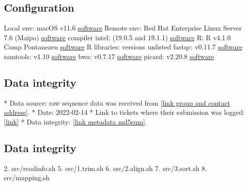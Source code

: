 \markdownRendererUlEndTight \markdownRendererInterblockSeparator
{}\subsection{Configuration}\markdownRendererInterblockSeparator
{}\markdownRendererUlBeginTight
\markdownRendererUlItem Local env: macOS v11.6 \href{https://support.apple.com/macos}{software}\markdownRendererUlItemEnd 
\markdownRendererUlItem Remote env: Red Hat Enterprise Linux Server 7.6 (Maipo) \href{https://www.redhat.com/en/technologies/linux-platforms/enterprise-linux}{software}\markdownRendererUlItemEnd 
\markdownRendererUlItem compiler intel: (19.0.5 and 19.1.1) \href{https://www.intel.com/content/www/us/en/developer/tools/oneapi/commercial-base-hpc.html#gs.ppyt3x}{software}\markdownRendererUlItemEnd 
\markdownRendererUlItem R: R v4.1.0 Camp Pontanezen \href{https://www.r-project.org}{software}\markdownRendererUlItemEnd 
\markdownRendererUlItem R libraries: versions unlisted\markdownRendererUlItemEnd 
\markdownRendererUlItem fastqc: v0.11.7 \href{https://www.bioinformatics.babraham.ac.uk/projects/fastqc/}{software}\markdownRendererUlItemEnd 
\markdownRendererUlItem samtools: v1.10 \href{https://www.htslib.org}{software}\markdownRendererUlItemEnd 
\markdownRendererUlItem bwa: v0.7.17 \href{https://janis.readthedocs.io/en/latest/tools/bioinformatics/bwa/bwamem.html}{software}\markdownRendererUlItemEnd 
\markdownRendererUlItem picard: v2.20.8 \href{http://broadinstitute.github.io/picard/}{software}\markdownRendererUlItemEnd 
\markdownRendererUlEndTight \markdownRendererInterblockSeparator
{}\subsection{Data integrity} * Data source: raw sequence data was received from [\href{https://www.sophiagenetics.com}{link group and contact address}]. * Date: 2022-02-14 * Link to tickets where their submission was logged: [\href{https://www.sophiagenetics.com}{link}] * Data integrity: [\href{https://github.com/DylanLawless/kit_assess/src/metadata/raw.md5sum}{link metadata md5sum}].\markdownRendererInterblockSeparator
{}\subsection{Data integrity} 2. src/readinfo.sh 5. src/1.trim.sh 6. src/2.align.sh 7. src/3.sort.sh 8. src/mapping.sh\markdownRendererInterblockSeparator
